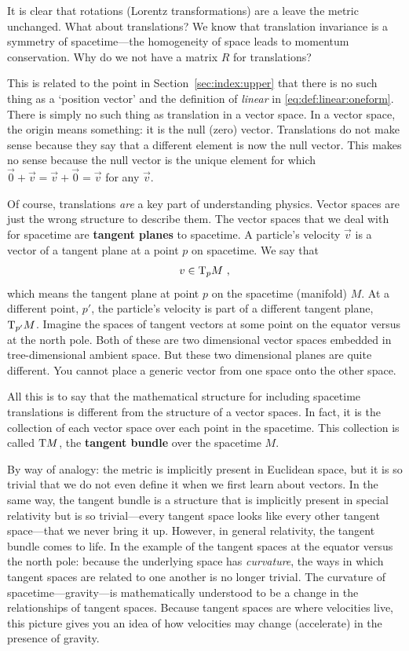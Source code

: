 \documentclass[12pt, oneside]{report}    %
\begin{document}
\begin{example}
It is clear that rotations (Lorentz transformations) are a leave the metric unchanged. What about translations? We know that translation invariance is a symmetry of spacetime---the homogeneity of space leads to momentum conservation. Why do we not have a matrix $R$ for translations?

This is related to the point in Section~\ref{sec:index:upper} that there is no such thing as a `position vector' and the definition of \emph{linear} in \eqref{eq:def:linear:oneform}. There is simply no such thing as translation in a vector space. In a vector space, the origin means something: it is the null (zero) vector. Translations do not make sense because they say that a different element is now the null vector. This makes no sense because the null vector is the unique element for which $\vec{0}+\vec{v} = \vec{v} + \vec{0} = \vec{v}$ for any $\vec{v}$. 

Of course, translations \emph{are} a key part of understanding physics. Vector spaces are just the wrong structure to describe them. The vector spaces that we deal with for spacetime are \textbf{tangent planes} to spacetime. A particle's velocity $\vec{v}$ is a vector of a tangent plane at a point $p$ on spacetime. We say that
\begin{align}
    v\in \textnormal{T}_p{M} \ ,
\end{align}
which means the tangent plane at point $p$ on the spacetime (manifold) $M$. At a different point, $p'$, the particle's velocity is part of a different tangent plane, $\textnormal{T}_{p'}M$. Imagine the spaces of tangent vectors at some point on the equator versus at the north pole. Both of these are two dimensional vector spaces embedded in tree-dimensional ambient space. But these two dimensional planes are quite different. You cannot place a generic vector from one space onto the other space. 

All this is to say that the mathematical structure for including spacetime translations is different from the structure of a vector spaces. In fact, it is the collection of each vector space over each point in the spacetime. This collection is called $\textnormal{T}M$, the \textbf{tangent bundle} over the spacetime $M$. 

By way of analogy: the metric is implicitly present in Euclidean space, but it is so trivial that we do not even define it when we first learn about vectors. In the same way, the tangent bundle is a structure that is implicitly present in special relativity but is so trivial---every tangent space looks like every other tangent space---that we never bring it up. However, in general relativity, the tangent bundle comes to life. In the example of the tangent spaces at the equator versus the north pole: because the underlying space has \emph{curvature}, the ways in which tangent spaces are related to one another is no longer trivial. The curvature of spacetime---gravity---is mathematically understood to be a change in the relationships of tangent spaces. Because tangent spaces are where velocities live, this picture gives you an idea of how velocities may change (accelerate) in the presence of gravity.


\end{example}
\end{document}
